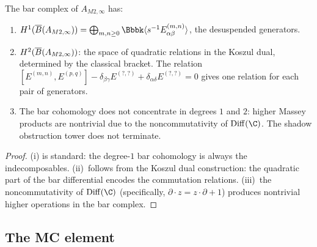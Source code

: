 \begin{proposition}
The bar complex of $A_{M2,\infty}$ has:
\begin{enumerate}[label=\textup{(\roman*)}]
\item $H^1(\barB(A_{M2,\infty})) = \bigoplus_{m,n \ge 0}
 \Bbbk\langle s^{-1}E^{(m,n)}_{\alpha\beta}\rangle$, the
 desuspended generators.
\item $H^2(\overline{B}(A_{M2,\infty}))$: the space of quadratic relations
 in the Koszul dual, determined by the classical bracket. The
 relation $[E^{(m,n)}, E^{(p,q)}] - \delta_{\beta\gamma}E^{(?,?)}
 + \delta_{\alpha\delta}E^{(?,?)} = 0$ gives one relation for each
 pair of generators.
\item The bar cohomology does not concentrate in degrees $1$ and $2$:
 higher Massey products are nontrivial due to the noncommutativity
 of $\Diff(\C)$. The shadow obstruction tower does not terminate.
\end{enumerate}
\end{proposition}

\begin{proof}
(i) is standard: the degree-$1$ bar cohomology is always the
indecomposables. (ii)~follows from the Koszul dual construction:
the quadratic part of the bar differential encodes the commutation
relations. (iii)~the noncommutativity of $\Diff(\C)$ (specifically,
$\partial \cdot z = z \cdot \partial + 1$) produces nontrivial
higher operations in the bar complex.
\end{proof}


\subsection{The MC element}

